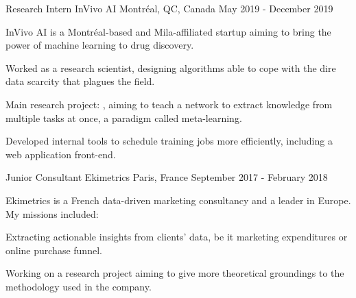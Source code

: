 

\begin{cventries}

    \cventry
    {Research Intern} %
    {InVivo AI} %
    {Montréal, QC, Canada} %
    {May 2019 - December 2019} %
    {
        InVivo AI is a Montréal-based and Mila-affiliated startup aiming to bring the power of machine learning to drug discovery.
        \vspace{5mm}
        \begin{cvitems} %
            \item Worked as a research scientist, designing algorithms able to cope with the dire data scarcity that plagues the field.
            \item Main research project: , aiming to teach a network to extract knowledge from multiple tasks at once, a paradigm called meta-learning.
            \item Developed internal tools to schedule training jobs more efficiently, including a web application front-end.
        \end{cvitems}
    }

    \cventry
    {Junior Consultant} %
    {Ekimetrics} %
    {Paris, France} %
    {September 2017 - February 2018} %
    {
        Ekimetrics is a French data-driven marketing consultancy and a leader in Europe. My missions included:
        \vspace{5mm}
        \begin{cvitems} %
            \item Extracting actionable insights from clients' data, be it marketing expenditures or online purchase funnel.
            \item Working on a research project aiming to give more theoretical groundings to the methodology used in the company.
        \end{cvitems}
    }


\end{cventries}
